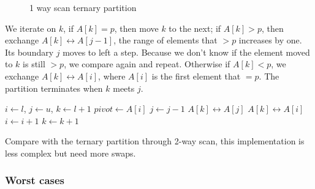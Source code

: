\documentclass[b5paper]{article}
\begin{document}
\begin{figure}[htbp]
   \centering
   \caption{1 way scan ternary partition}
   \label{fig:partition-3-way-lomuto}
\end{figure}

We iterate on $k$, if $A[k] = p$, then move $k$ to the next; if $A[k] > p$, then exchange $A[k] \leftrightarrow A[j-1]$, the range of elements that $> p$ increases by one. Its boundary $j$ moves to left a step. Because we don't know if the element moved to $k$ is still $> p$, we compare again and repeat. Otherwise if $A[k] < p$, we exchange $A[k] \leftrightarrow A[i]$, where $A[i]$ is the first element that $= p$. The partition terminates when $k$ meets $j$.

\begin{algorithmic}[1]
    \State $i \gets l$, $j \gets u$, $k \gets l + 1$
    \State $pivot \gets A[i]$
        \State $j \gets j - 1$
        \State {} $A[k] \leftrightarrow A[j]$
      \EndWhile
        \State {} $A[k] \leftrightarrow A[i]$
        \State $i \gets i + 1$
      \EndIf
      \State $k \gets k + 1$
    \EndWhile
    \State {}
    \State {}
  \EndIf
\EndProcedure
\end{algorithmic}

Compare with the ternary partition through 2-way scan, this implementation is less complex but need more swaps.

\subsubsection{Worst cases}
\end{document}
